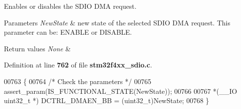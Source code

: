 Enables or disables the S\+D\+IO D\+MA request. 


\begin{DoxyParams}{Parameters}
{\em New\+State} & new state of the selected S\+D\+IO D\+MA request. This parameter can be\+: E\+N\+A\+B\+LE or D\+I\+S\+A\+B\+LE. \\
\hline
\end{DoxyParams}

\begin{DoxyRetVals}{Return values}
{\em None} & \\
\hline
\end{DoxyRetVals}


Definition at line \textbf{ 762} of file \textbf{ stm32f4xx\+\_\+sdio.\+c}.


\begin{DoxyCode}
00763 \{
00764   \textcolor{comment}{/* Check the parameters */}
00765   assert_param(IS_FUNCTIONAL_STATE(NewState));
00766   
00767   *(\_\_IO uint32\_t *) DCTRL_DMAEN_BB = (uint32\_t)NewState;
00768 \}
\end{DoxyCode}
